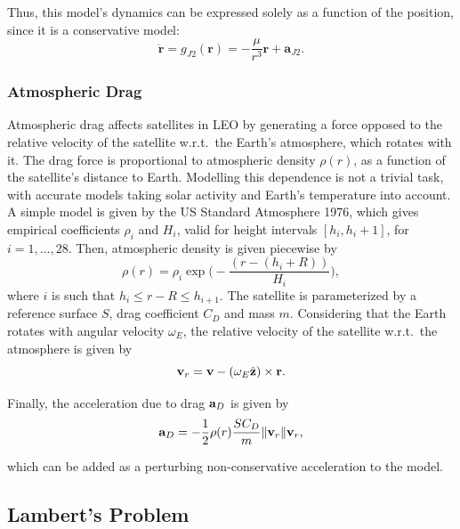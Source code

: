 Thus, this model's dynamics can be expressed solely as a function of the position, since it is a conservative model:
\begin{equation}
    \ddot{\mathbf{r}} = g_{J2}(\mathbf{r}) = -\frac{\mu}{r^3} \mathbf{r} + \mathbf{a}_{J2}.
\end{equation}

\subsubsection{Atmospheric Drag}

Atmospheric drag affects satellites in LEO by generating a force opposed to the relative velocity of the satellite w.r.t.\ the Earth's atmosphere, which rotates with it. The drag force is proportional to atmospheric density \(\rho(r)\), as a function of the satellite's distance to Earth. Modelling this dependence is not a trivial task, with accurate models taking solar activity and Earth's temperature into account. A simple model is given by the US Standard Atmosphere 1976, which gives empirical coefficients \(\rho_i\) and \(H_i\), valid for height intervals \([h_i, h_i+1]\), for \(i = 1,\dots, 28\). Then, atmospheric density is given piecewise by
\begin{equation}
    \rho(r) = \rho_i \exp{\big(-\frac{\left(r - (h_i + R)\right)}{H_i}\big)},
\end{equation}
where \(i\) is such that \(h_i \leq r - R \leq h_{i+1}\). The satellite is parameterized by a reference surface \(S\), drag coefficient \(C_D\) and mass \(m\). Considering that the Earth rotates with angular velocity \(\omega_E\), the relative velocity of the satellite w.r.t.\ the atmosphere is given by
\begin{equation}
    \mathbf{v}_{r} = \mathbf{v} - (\omega_E \hat{\mathbf{z}}) \times \mathbf{r}.
\end{equation}

Finally, the acceleration due to drag \(\mathbf{a}_D\) is given by
\begin{equation}\label{eq:acc_drag}
    \acc_D = - \frac{1}{2} \rho(r) \frac{S C_D}{m} \lVert \vel_r \rVert \vel_r,
\end{equation}

which can be added as a perturbing non-conservative acceleration to the model.

\subsection{Lambert's Problem}

